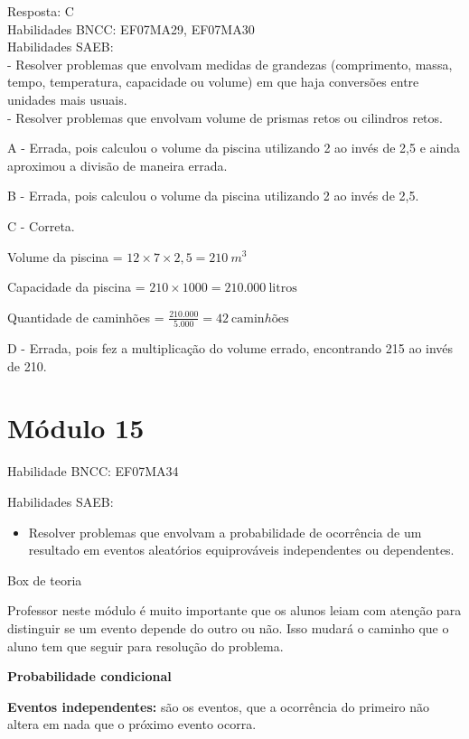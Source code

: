 {{{{{{{{{{{{Resposta: C\\
Habilidades BNCC: EF07MA29, EF07MA30\\
Habilidades SAEB:\\
- Resolver problemas que envolvam medidas de grandezas (comprimento,
massa, tempo, temperatura, capacidade ou volume) em que haja conversões
entre unidades mais usuais.\\
- Resolver problemas que envolvam volume de prismas retos ou cilindros
retos.

A - Errada, pois calculou o volume da piscina utilizando 2 ao invés de
2,5 e ainda aproximou a divisão de maneira errada.

B - Errada, pois calculou o volume da piscina utilizando 2 ao invés de
2,5.

C - Correta.

Volume da piscina = \(12 \times 7 \times 2,5 = 210\ m^{3}\ \)

Capacidade da piscina = \(210 \times 1000 = 210.000\ \text{litros}\)

Quantidade de caminhões =
\(\frac{210.000}{5.000} = 42\ \text{camin}hõ\text{es}\)

D - Errada, pois fez a multiplicação do volume errado, encontrando 215
ao invés de 210.

\hypertarget{muxf3dulo-15}{%
\section{Módulo 15}

Habilidade BNCC: EF07MA34

Habilidades SAEB:

\begin{itemize}
\tightlist
\item
  Resolver problemas que envolvam a probabilidade de ocorrência de um
  resultado em eventos aleatórios equiprováveis independentes ou
  dependentes.
\end{itemize}

Box de teoria

Professor neste módulo é muito importante que os alunos leiam com
atenção para distinguir se um evento depende do outro ou não. Isso
mudará o caminho que o aluno tem que seguir para resolução do problema.

\textbf{{Probabilidade condicional}}

\textbf{Eventos independentes:} são os eventos, que a ocorrência do
primeiro não altera em nada que o próximo evento ocorra.

}}}}}}}}}}}}}
